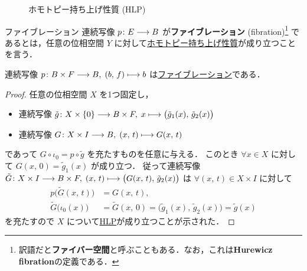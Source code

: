 \documentclass[algtopo_main]{subfiles}
\begin{document}
\begin{figure}[H]
    \centering
    \caption{ホモトピー持ち上げ性質 (HLP)}
    \label{cmtd:HLP}
\end{figure}%

\begin{mydef}[label=def:fibration]{ファイブレーション}
    連続写像 $p \colon E \longrightarrow B$ が\textbf{ファイブレーション} (fibration)\footnote{訳語だと\textbf{ファイバー空間}と呼ぶこともある．なお，これは\textbf{Hurewicz fibration}の定義である．} であるとは，任意の位相空間 $Y$ に対して\hyperref[def:HLP]{ホモトピー持ち上げ性質}が成り立つことを言う．
\end{mydef}

\begin{mylem}[label=lem:fib-product]{}
    連続写像 $p \colon B \times F \longrightarrow B,\; (b,\, f) \longmapsto b$ は\hyperref[def:fibration]{ファイブレーション}である．
\end{mylem}

\begin{proof}
    任意の位相空間 $X$ を1つ固定し，
    \begin{itemize}
        \item 連続写像 $ \tilde{g} \colon X \times \{0\} \longrightarrow B \times F,\; x \longmapsto \bigl(\tilde{g}_1(x),\, \tilde{g}_2(x)\bigr)$
        \item 連続写像 $G \colon X \times I \longrightarrow B,\; (x,\, t) \longmapsto G(x,\, t)$
    \end{itemize}
    であって $G \circ \iota_0 = p \circ \tilde{g}$ を充たすものを任意に与える．
    このとき $\forall x \in X$ に対して $G(x,\, 0) = \tilde{g}_1(x)$ が成り立つ．
    従って連続写像 $\tilde{G} \colon X \times I \longrightarrow B \times F,\; (x,\, t) \longmapsto \bigl( G(x,\, t),\, \tilde{g}_2(x) \bigr)$ は $\forall (x,\, t) \in X \times I$ に対して
    \begin{align}
        p \bigl( \tilde{G}(x,\, t) \bigr) &= G (x,\, t), \\
        \tilde{G} \bigl( \iota_0(x) \bigr) &=  \tilde{G}(x,\, 0) = \bigl(\tilde{g}_1(x),\, \tilde{g}_2(x) \bigr) = \tilde{g}(x)
    \end{align}
    を充たすので
    $X$ について\hyperref[def:HLP]{HLP}が成り立つことが示された．
\end{proof}
\end{document}
